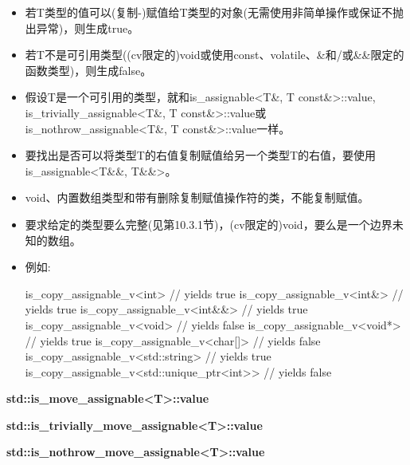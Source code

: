 \begin{itemize}
\item
若T类型的值可以(复制-)赋值给T类型的对象(无需使用非简单操作或保证不抛出异常)，则生成true。

\item
若T不是可引用类型((cv限定的)void或使用const、volatile、\&和/或\&\&限定的函数类型)，则生成false。
 
\item
假设T是一个可引用的类型，就和is\_assignable<T\&, T const\&>::value, is\_trivially\_assignable<T\&, T const\&>::value或is\_nothrow\_assignable<T\&, T const\&>::value一样。

\item
要找出是否可以将类型T的右值复制赋值给另一个类型T的右值，要使用is\_assignable<T\&\&, T\&\&>。

\item
void、内置数组类型和带有删除复制赋值操作符的类，不能复制赋值。

\item
要求给定的类型要么完整(见第10.3.1节)，(cv限定的)void，要么是一个边界未知的数组。

\item
例如:
\begin{cpp}
is_copy_assignable_v<int> // yields true
is_copy_assignable_v<int&> // yields true
is_copy_assignable_v<int&&> // yields true
is_copy_assignable_v<void> // yields false
is_copy_assignable_v<void*> // yields true
is_copy_assignable_v<char[]> // yields false
is_copy_assignable_v<std::string> // yields true
is_copy_assignable_v<std::unique_ptr<int>> // yields false
\end{cpp}
\end{itemize}

\textbf{std::is\_move\_assignable<T>::value}

\textbf{std::is\_trivially\_move\_assignable<T>::value}

\textbf{std::is\_nothrow\_move\_assignable<T>::value}

